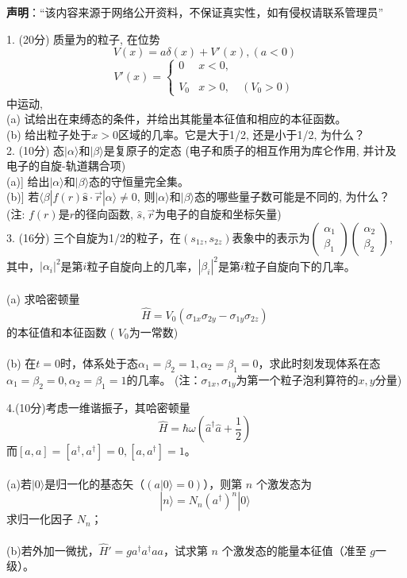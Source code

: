 
\textbf{声明}：“该内容来源于网络公开资料，不保证真实性，如有侵权请联系管理员”

1. (20分) 质量为的粒子, 在位势
$$V(x) = a \delta (x) + V'(x), (a < 0)~$$
$$V'(x) = \begin{cases} 0 & x < 0, \\\\ V_0 & x > 0,\quad (V_0 > 0)\end{cases}~$$
中运动,\\
(a) 试给出在束缚态的条件，并给出其能量本征值和相应的本征函数。\\
(b) 给出粒子处于$ x > 0 $区域的几率。它是大于1/2, 还是小于1/2, 为什么？\\

2. (10分) 态$|\alpha\rangle$和$|\beta\rangle$是复原子的定态 (电子和质子的相互作用为库仑作用, 并计及电子的自旋-轨道耦合项)\\
(a)] 给出$|\alpha\rangle$和$|\beta\rangle$态的守恒量完全集。\\
(b)] 若$\langle \beta | f({r}) \hat{\mathbf{s}} \cdot \vec{r} | \alpha \rangle \neq 0$, 则$|\alpha\rangle$和$|\beta\rangle$态的哪些量子数可能是不同的, 为什么？\\
(注: $f({r})$是$r$的径向函数, $\hat{s},\vec{r}$为电子的自旋和坐标矢量)\\

3. (16分) 三个自旋为1/2的粒子，在$(s_{1z}, s_{2z})$表象中的表示为$\begin{pmatrix} \alpha_1 \\ \beta_1 \end{pmatrix} \begin{pmatrix} \alpha_2 \\ \beta_2 \end{pmatrix}$, 其中，$\left|\alpha_i\right|^2$是第$i$粒子自旋向上的几率，$\left|\beta_i\right|^2$是第$i$粒子自旋向下的几率。\\\\
(a) 求哈密顿量 
$$\hat{H} = V_0 (\sigma_{1x} \sigma_{2y} - \sigma_{1y} \sigma_{2z})~$$
    的本征值和本征函数 ( $V_0$为一常数)\\\\
(b) 在$t=0$时，体系处于态$\alpha_1 = \beta_2 = 1, \alpha_2 = \beta_1 = 0$，求此时刻发现体系在态$\alpha_1 = \beta_2 = 0, \alpha_2 = \beta_1 = 1$的几率。
    (注：$\sigma_{1x}, \sigma_{1y}$为第一个粒子泡利算符的$x,y$分量)

4.(10分)考虑一维谐振子，其哈密顿量
$$\hat{H} = \hbar \omega \left( \hat{a}^\dagger \hat{a} + \frac{1}{2} \right)~$$
    而$[a, a] = [a^\dagger, a^\dagger] = 0, [a, a^\dagger] = 1$。\\\\
(a)若$|0\rangle$是归一化的基态矢（$(a|0\rangle = 0)$），则第 $n$ 个激发态为
$$|n\rangle = N_n (a^\dagger)^n |0\rangle~$$
        求归一化因子 $N_n$；\\\\
(b)若外加一微扰，$\hat{H}' = g a^\dagger a^\dagger a a$，试求第 $n$ 个激发态的能量本征值（准至 $g$一级）。



